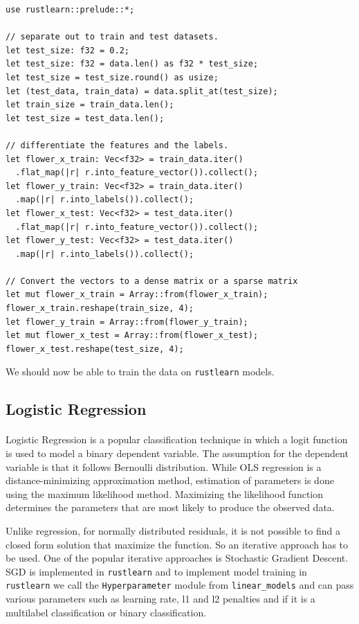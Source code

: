 \documentclass{book}
\begin{document}
\begin{lstlisting}[caption={chapter3\\/rustlearn\_classification\_tasks\\/src\\/logistic\_reg\\.rs}]
use rustlearn::prelude::*;

// separate out to train and test datasets.
let test_size: f32 = 0.2;
let test_size: f32 = data.len() as f32 * test_size;
let test_size = test_size.round() as usize;
let (test_data, train_data) = data.split_at(test_size);
let train_size = train_data.len();
let test_size = test_data.len();

// differentiate the features and the labels.
let flower_x_train: Vec<f32> = train_data.iter()
  .flat_map(|r| r.into_feature_vector()).collect();
let flower_y_train: Vec<f32> = train_data.iter()
  .map(|r| r.into_labels()).collect();
let flower_x_test: Vec<f32> = test_data.iter()
  .flat_map(|r| r.into_feature_vector()).collect();
let flower_y_test: Vec<f32> = test_data.iter()
  .map(|r| r.into_labels()).collect();

// Convert the vectors to a dense matrix or a sparse matrix
let mut flower_x_train = Array::from(flower_x_train);
flower_x_train.reshape(train_size, 4);
let flower_y_train = Array::from(flower_y_train);
let mut flower_x_test = Array::from(flower_x_test);
flower_x_test.reshape(test_size, 4);
\end{lstlisting}

We should now be able to train the data on \lstinline{rustlearn} models.
\label{sub:iris_data_set}

\subsection{Logistic Regression}%
\paragraph{}%
Logistic Regression is a popular classification technique in which a logit function is used to model a binary dependent variable. The assumption for the dependent variable is that it follows Bernoulli distribution. While OLS regression is a distance-minimizing approximation method, estimation of parameters is done using the maximum likelihood method. Maximizing the likelihood function determines the parameters that are most likely to produce the observed data.
\label{par:}

Unlike regression, for normally distributed residuals, it is not possible to find a closed form solution that maximize the function. So an iterative approach has to be used. One of the popular iterative approaches is Stochastic Gradient Descent. SGD is implemented in \lstinline{rustlearn} and to implement model training in \lstinline{rustlearn} we call the \lstinline{Hyperparameter} module from \lstinline{linear_models} and can pass various parameters such as learning rate, l1 and l2 penalties and if it is a multilabel classification or binary classification.
\end{document}
